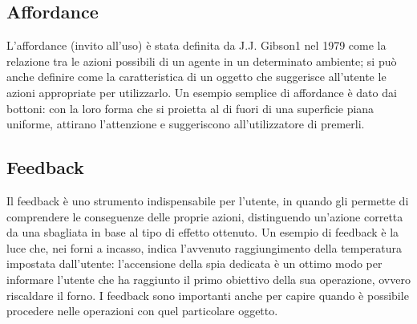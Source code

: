 \documentclass[11pt,a4paper]{article}
\begin{document}
\subsection{Affordance}
L’affordance (invito all’uso) è stata definita da J.J. Gibson1 nel 1979 come la relazione tra le azioni possibili di un agente in un determinato ambiente; si può anche definire come la caratteristica di un oggetto che suggerisce all’utente le azioni appropriate per utilizzarlo. Un esempio semplice di affordance è dato dai bottoni: con la loro forma che si proietta al di fuori di una superficie piana uniforme, attirano l’attenzione e suggeriscono all’utilizzatore di premerli.
\subsection{Feedback}
Il feedback è uno strumento indispensabile per l’utente, in quando gli permette di comprendere le conseguenze delle proprie azioni, distinguendo un’azione corretta da una sbagliata in base al tipo di effetto ottenuto.
Un esempio di feedback è la luce che, nei forni a incasso, indica l’avvenuto raggiungimento della temperatura impostata dall’utente: l’accensione della spia dedicata è un ottimo modo per informare l’utente che ha raggiunto il primo obiettivo della sua operazione, ovvero riscaldare il forno.
I feedback sono importanti anche per capire quando è possibile procedere nelle operazioni con quel particolare oggetto.
\end{document}
